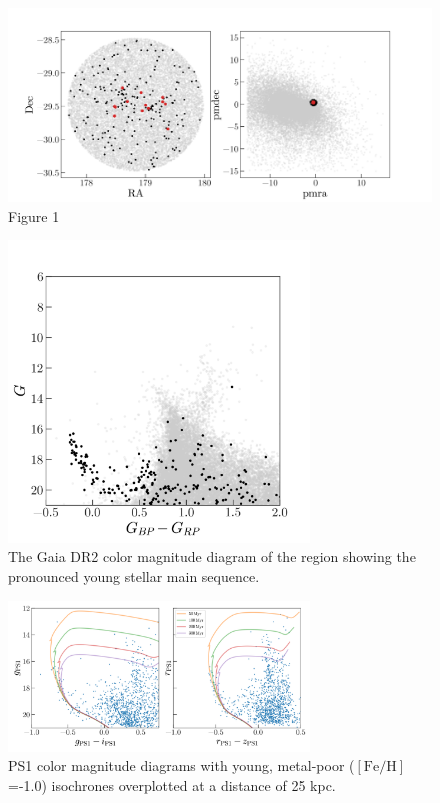 \documentclass[modern]{aastex62}
\newcommand{\feh}{\ensuremath{[\textrm{Fe} / \textrm{H}]}}
\begin{document}
\begin{figure}
\centering
\includegraphics[width=12cm]{sky_pm.png}
\caption{Figure 1}
\label{fig_skypm}
\end{figure}

\begin{figure}
\centering
\includegraphics[width=8cm]{cmd.png}
\caption{The Gaia DR2 color magnitude diagram of the region showing the pronounced
young stellar main sequence.}
\label{fig_cmd}
\end{figure}

\begin{figure}
\centering
\includegraphics[width=8cm]{isochrone.png}
\caption{PS1 color magnitude diagrams with young, metal-poor (\feh=-1.0) isochrones overplotted at
a distance of 25 kpc.}
\label{fig_isochrone}
\end{figure}
\end{document}
